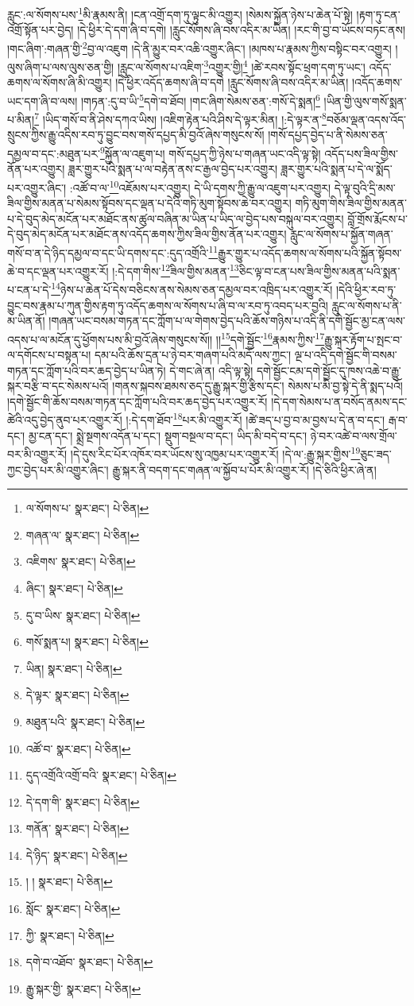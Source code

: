 རླུང་:ལ་སོགས་པས་\footnote{ལ་སོགས་པ་  སྣར་ཐང་།  པེ་ཅིན། }མི་རྣམས་ནི། །ངན་འགྲོ་དག་ཏུ་ལྟུང་མི་འགྱུར། །སེམས་སྐྱོན་ཉེས་པ་ཆེན་པོ་སྟེ། །རྟག་ཏུ་ངན་འགྲོ་སྟོན་པར་བྱེད། །དེ་ཕྱིར་དེ་དག་ཞི་བ་དགེ། །རླུང་སོགས་ཞི་བས་འདིར་མ་ཡིན། །རང་གི་བྱ་བ་ཡོངས་བཏང་ནས། །གང་ཞིག་:གཞན་གྱི་\footnote{གཞན་ལ་  སྣར་ཐང་།  པེ་ཅིན། }བྱ་ལ་འཇུག །དེ་ནི་མྱུར་བར་འཆི་འགྱུར་ཞིང་། །མཁས་པ་རྣམས་ཀྱིས་བསྟིང་བར་འགྱུར། །ལུས་ཞིག་པ་ལས་ལུས་ཅན་གྱི། །རླུང་ལ་སོགས་པ་འཇིག་\footnote{འཇིགས་  སྣར་ཐང་།  པེ་ཅིན། }འགྱུར་གྱི།\footnote{ཞིང་།  སྣར་ཐང་།  པེ་ཅིན། } །ཚེ་རབས་སྟོང་ཕྲག་དག་ཏུ་ཡང་། འདོད་ཆགས་ལ་སོགས་ཞི་མི་འགྱུར། །དེ་ཕྱིར་འདོད་ཆགས་ཞི་བ་དགེ །རླུང་སོགས་ཞི་བས་འདིར་མ་ཡིན། །འདོད་ཆགས་ཡང་དག་ཞི་བ་ལས། །གཏན་:དུ་བ་ཡི་\footnote{དུ་བ་ཡིས་  སྣར་ཐང་།  པེ་ཅིན། }དགེ་བ་ཐོབ། །གང་ཞིག་སེམས་ཅན་:གསོ་དེ་སྨན།\footnote{གསོ་སྨན་པ།  སྣར་ཐང་།  པེ་ཅིན། } །ཡིན་གྱི་ལུས་གསོ་སྨན་པ་མིན།\footnote{ཡིན།  སྣར་ཐང་།  པེ་ཅིན། } །ཡིད་གསོ་བ་ནི་ཤེས་དཀའ་ཡིས། །འཇིག་རྟེན་པའི་ཤིས་དེ་ལྟར་མིན། །:དེ་ལྟར་ན་\footnote{དེ་ལྟར་  སྣར་ཐང་།  པེ་ཅིན། }བཅོམ་ལྡན་འདས་འོད་སྲུངས་ཀྱིས་རྒྱུ་འདིས་རབ་ཏུ་བྱུང་བས་གསོ་དཔྱད་མི་བྱའོ་ཞེས་གསུངས་སོ། །གསོ་དཔྱད་བྱེད་པ་ནི་སེམས་ཅན་དམྱལ་བ་དང་:མཐུན་པར་\footnote{མཐུན་པའི་  སྣར་ཐང་།  པེ་ཅིན། }སྐྱོན་ལ་འཇུག་པ། གསོ་དཔྱད་ཀྱི་ཉེས་པ་གཞན་ཡང་འདི་ལྟ་སྟེ། འདོད་པས་ཟིལ་གྱིས་ནོན་པར་འགྱུར། ཟླར་གྱུར་པའི་སྨན་པ་ལ་བརྟེན་ནས་ང་རྒྱལ་བྱེད་པར་འགྱུར། ཟླར་གྱུར་པའི་སྨན་པ་དེ་ལ་སྨོད་པར་འགྱུར་ཞིང་། :འཚོ་བ་ལ་\footnote{འཚོ་བ་  སྣར་ཐང་།  པེ་ཅིན། }འཇོམས་པར་འགྱུར། དེ་ཡི་དགས་ཀྱི་རྒྱུ་ལ་འཇུག་པར་འགྱུར། དེ་ལྟ་བུའི་དྲི་མས་ཟིལ་གྱིས་མནན་པ་སེམས་སྟོབས་དང་ལྡན་པ་དེའི་གཏི་མུག་སྟོབས་ཆེ་བར་འགྱུར། གཏི་མུག་གིས་ཟིལ་གྱིས་མནན་པ་དེ་བུད་མེད་མངོན་པར་མཐོང་ནས་ཚུལ་བཞིན་མ་ཡིན་པ་ཡིད་ལ་བྱེད་པས་བསྐུལ་བར་འགྱུར། བློ་གྲོས་རྨོངས་པ་དེ་བུད་མེད་མངོན་པར་མཐོང་ནས་འདོད་ཆགས་ཀྱིས་ཟིལ་གྱིས་ནོན་པར་འགྱུར། རླུང་ལ་སོགས་པ་སྐྱོན་གཞན་གསོ་བ་ན་དེ་ཉིད་དམྱལ་བ་དང་ཡི་དགས་དང་:དུད་འགྲོའི་\footnote{དུད་འགྲོའི་འགྲོ་བའི་  སྣར་ཐང་།  པེ་ཅིན། }རྒྱུར་གྱུར་པ་འདོད་ཆགས་ལ་སོགས་པའི་སྐྱོན་སྟོབས་ཆེ་བ་དང་ལྡན་པར་འགྱུར་རོ། །:དེ་དག་གིས་\footnote{དེ་དག་གི་  སྣར་ཐང་།  པེ་ཅིན། }ཟིལ་གྱིས་མནན་\footnote{གནོན་  སྣར་ཐང་།  པེ་ཅིན། }ཅིང་ལྟ་བ་ངན་པས་ཟིལ་གྱིས་མནན་པའི་སྨན་པ་ངན་པ་དེ་\footnote{དེ་ཉིད་  སྣར་ཐང་།  པེ་ཅིན། }ཉེས་པ་ཆེན་པོ་དེས་བཅིངས་ནས་སེམས་ཅན་དམྱལ་བར་འཁྲིད་པར་འགྱུར་རོ། །དེའི་ཕྱིར་རབ་ཏུ་བྱུང་བས་རྣམ་པ་ཀུན་གྱིས་རྟག་ཏུ་འདོད་ཆགས་ལ་སོགས་པ་ཞི་བ་ལ་རབ་ཏུ་འབད་པར་བྱའི། རླུང་ལ་སོགས་པ་ནི་མ་ཡིན་ནོ། །གཞན་ཡང་བསམ་གཏན་དང་ཀློག་པ་ལ་གེགས་བྱེད་པའི་ཆོས་གཉིས་པ་འདི་ནི་དགེ་སྦྱོང་མྱ་ངན་ལས་འདས་པ་ལ་མངོན་དུ་ཕྱོགས་པས་མི་བྱའོ་ཞེས་གསུངས་སོ།། །།\footnote{། །  སྣར་ཐང་།  པེ་ཅིན། }དགེ་སྦྱོང་\footnote{སློང་  སྣར་ཐང་།  པེ་ཅིན། }རྣམས་ཀྱིས་\footnote{ཀྱི་  སྣར་ཐང་།  པེ་ཅིན། }རྒྱུ་སྐར་རྟོག་པ་སྤང་བ་ལ་དགོངས་པ་བསྟན་པ། དམ་པའི་ཆོས་དྲན་པ་ཉེ་བར་གཞག་པའི་མདོ་ལས་ཀྱང་། ལྔ་པ་འདི་དགེ་སྦྱོང་གི་བསམ་གཏན་དང་ཀློག་པའི་བར་ཆད་བྱེད་པ་ཡིན་ཏེ། དེ་གང་ཞེ་ན། འདི་ལྟ་སྟེ། དགེ་སྦྱོང་ངམ་དགེ་སྦྱོང་དུ་ཁས་འཆེ་བ་རྒྱུ་སྐར་བརྩི་བ་དང་སེམས་པའོ། །གནས་སྐབས་ཐམས་ཅད་དུ་རྒྱུ་སྐར་གྱི་རྩིས་དང་། སེམས་པ་མི་བྱ་སྟེ་དེ་ནི་སྨད་པའོ། །དགེ་སྦྱོང་གི་ཆོས་བསམ་གཏན་དང་ཀློག་པའི་བར་ཆད་བྱེད་པར་འགྱུར་རོ། །དེ་དག་སེམས་པ་ན་བསོད་ནམས་དང་ཚེའི་འདུ་བྱེད་ནུབ་པར་འགྱུར་རོ། །:དེ་དག་ཐོབ་\footnote{དགེ་བ་འཐོབ་  སྣར་ཐང་།  པེ་ཅིན། }པར་མི་འགྱུར་རོ། །ཚེ་ཟད་པ་བྱ་བ་མ་བྱས་པ་དེ་ན་བ་དང་། རྒ་བ་དང་། མྱ་ངན་དང་། སྨྲེ་སྔགས་འདོན་པ་དང་། སྡུག་བསྔལ་བ་དང་། ཡིད་མི་བདེ་བ་དང་། ཉེ་བར་འཚེ་བ་ལས་གྲོལ་བར་མི་འགྱུར་རོ། །དེ་དུས་རིང་པོར་འཁོར་བར་ཡོངས་སུ་འཁྱམ་པར་འགྱུར་རོ། །དེ་ལ་:རྒྱུ་སྐར་གྱིས་\footnote{རྒྱུ་སྐར་གྱི་  སྣར་ཐང་།  པེ་ཅིན། }ཅུང་ཟད་ཀྱང་བྱེད་པར་མི་འགྱུར་ཞིང་། རྒྱུ་སྐར་ནི་བདག་དང་གཞན་ལ་སྐྱོབ་པ་པོར་མི་འགྱུར་རོ། །དེ་ཅིའི་ཕྱིར་ཞེ་ན། 